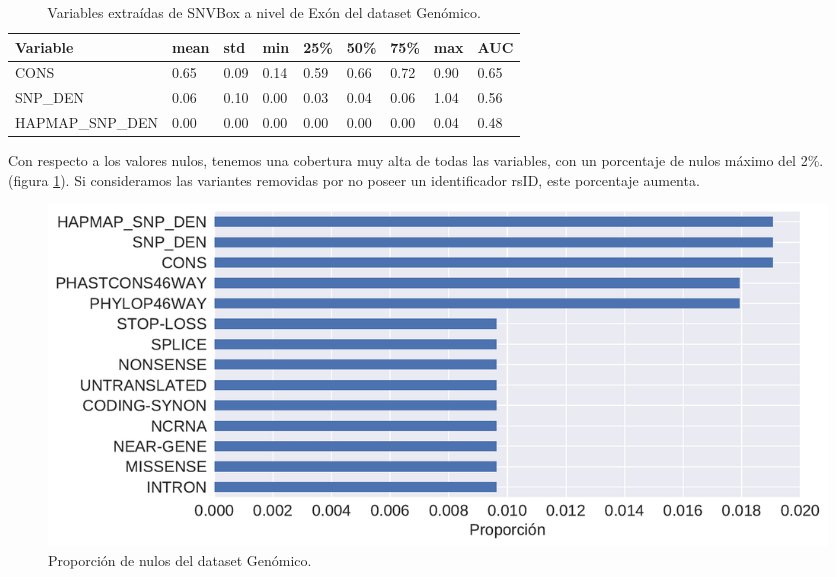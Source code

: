 \begin{table}[H]
\centering
\begin{tabular}{|l|l|l|l|l|l|l|l|l|}
\hline
Variable         & mean & std  & min  & 25\% & 50\% & 75\% & max & AUC  \\ \hline
CONS             & 0.65 & 0.09 & 0.14 & 0.59 & 0.66 & 0.72 & 0.90 & 0.65 \\ \hline
SNP\_DEN         & 0.06 & 0.10 & 0.00 & 0.03 & 0.04 & 0.06 & 1.04 & 0.56 \\ \hline
HAPMAP\_SNP\_DEN & 0.00 & 0.00 & 0.00 & 0.00 & 0.00 & 0.00 & 0.04 & 0.48 \\ \hline
\end{tabular}
\caption{Variables extraídas de SNVBox a nivel de Exón del dataset Genómico.}
\label{snvbox_vars}
\end{table}


Con respecto a los valores nulos, tenemos una cobertura muy alta de todas las variables, con un porcentaje de nulos máximo del 2\%. (figura \ref{fig:proporcion_nulos_genomic}). Si consideramos las variantes removidas por no poseer un identificador rsID, este porcentaje aumenta.



\begin{figure}[H]
    \centering
    \includegraphics[scale=0.6]{documents/latex/figures/3/genomic/proporcion_nulos_genomic.pdf}
    \caption{Proporción de nulos del dataset Genómico.}
    \label{fig:proporcion_nulos_genomic}
\end{figure}

